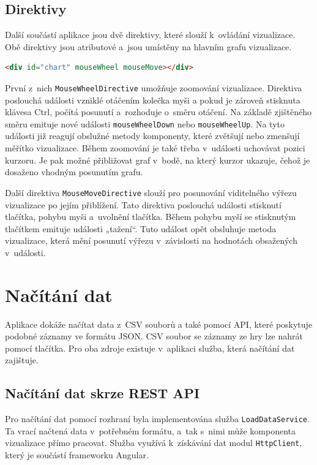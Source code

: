 \documentclass[
  digital, %
  oneside, %
  table,   %
  nolof,     %
  nolot,     %
]{fithesis3}
\begin{document}
\subsection{Direktivy} \label{directives}
Další součástí aplikace jsou dvě direktivy, které slouží k~ovládání vizualizace. Obě direktivy jsou atributové a~jsou umístěny na hlavním grafu vizualizace.\par
\begin{lstlisting}[showstringspaces=false,language=html]
<div id="chart" mouseWheel mouseMove></div>
\end{lstlisting}
První z~nich \verb|MouseWheelDirective| umožňuje zoomování vizualizace. Direktiva poslouchá události vzniklé otáčením kolečka myši a pokud je zároveň stisknuta klávesa Ctrl, počítá posunutí a~rozhoduje o~směru otáčení. Na základě zjištěného směru emituje nové události \verb|mouseWheelDown| nebo \verb|mouseWheelUp|. Na tyto události již reagují obslužné metody komponenty, které zvětšují nebo zmenšují měřítko vizualizace. Během zoomování je také třeba v~události uchovávat pozici kurzoru. Je pak možné přibližovat graf v~bodě, na který kurzor ukazuje, čehož je dosaženo vhodným posunutím grafu.\par
Další direktiva \verb|MouseMoveDirective| slouží pro posunování viditelného výřezu vizualizace po jejím přiblížení. Tato direktiva poslouchá události stisknutí tlačítka, pohybu myši a~uvolnění tlačítka. Během pohybu myší se stisknutým tlačítkem emituje události „tažení“. Tuto událost opět obsluhuje metoda vizualizace, která mění posunutí výřezu v~závislosti na hodnotách obsažených v~události.

\section{Načítání dat}
Aplikace dokáže načítat data z~CSV souborů a také pomocí API, které poskytuje podobné záznamy ve formátu JSON. CSV soubor se záznamy ze hry lze nahrát pomocí tlačítka. Pro oba zdroje existuje v~aplikaci služba, která načítání dat zajištuje.
\subsection{Načítání dat skrze REST API}
Pro načítání dat pomocí rozhraní byla implementována služba \verb|Load|\-\verb|DataService|. Ta vrací načtená data v~potřebném formátu, a~tak s~nimi může komponenta vizualizace přímo pracovat. Služba využívá k~získávání dat modul \verb|HttpClient|, který je součástí frameworku Angular.
\end{document}
